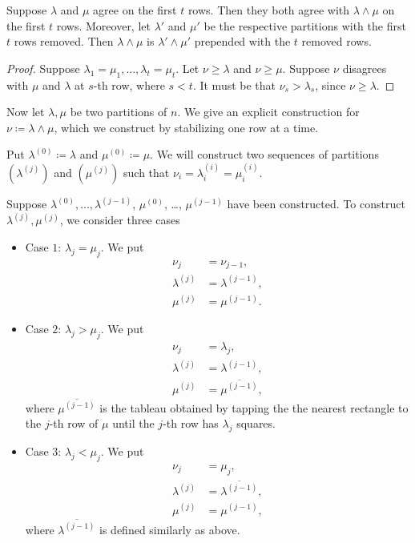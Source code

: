 \documentclass{article}
\begin{document}
\begin{lemma}
    Suppose $\lambda$ and $\mu$ agree on the first $t$ rows. Then they both agree with $\lambda \wedge \mu$ on the first $t$ rows. Moreover, let $\lambda'$ and $\mu'$ be the respective partitions with the first $t$ rows removed. Then $\lambda \wedge \mu$ is $\lambda' \wedge \mu'$ prepended with the $t$ removed rows.
\end{lemma}
\begin{proof}
    Suppose $\lambda_1 = \mu_1, \ldots, \lambda_t = \mu_t$.
    Let $\nu \geq \lambda$ and $\nu \geq \mu$.
    Suppose $\nu$ disagrees with $\mu$ and $\lambda$ at $s$-th row, where $s < t$.
    It must be that $\nu_s > \lambda_s$, since $\nu \geq \lambda$. 
\end{proof}

Now let $\lambda, \mu$ be two partitions of $n$. 
We give an explicit construction for $\nu \coloneq \lambda \wedge \mu$, which we construct by stabilizing one row at a time.

Put $\lambda^{(0)} \coloneq \lambda$ and $\mu^{(0)} \coloneq \mu$. We will construct two sequences of partitions $(\lambda^{(j)})$ and $(\mu^{(j)})$ such that $\nu_i = \lambda^{(i)}_i = \mu^{(i)}_i$.


Suppose $\lambda^{(0)}, \ldots, \lambda^{(j-1)}$, $\mu^{(0)}$, \ldots, $\mu^{(j-1)}$ have been constructed. 
To construct $\lambda^{(j)}, \mu^{(j)}$, we consider three cases
\begin{itemize}
    \item Case $1$: $\lambda_j = \mu_j$. We put 
        \begin{align*}
            \nu_j &= \nu_{j-1}, \\
            \lambda^{(j)} &= \lambda^{(j-1)}, \\
            \mu^{(j)} &= \mu^{(j-1)}.
        \end{align*}
    \item Case $2$: $\lambda_j > \mu_j$. We put 
        \begin{align*}
            \nu_j &= \lambda_j, \\
            \lambda^{(j)} &= \lambda^{(j-1)}, \\
            \mu^{(j)} &= \overline{\mu^{(j-1)}},
        \end{align*}
        where $\overline{\mu^{(j-1)}}$ is the tableau obtained by tapping the the nearest rectangle to the $j$-th row of $\mu$ until the $j$-th row has $\lambda_j$ squares.
    \item Case $3$: $\lambda_j < \mu_j$. We put 
        \begin{align*}
            \nu_j &= \mu_j, \\
            \lambda^{(j)} &= \overline{\lambda^{(j-1)}}, \\
            \mu^{(j)} &= \mu^{(j-1)},
        \end{align*}
        where $\overline{\lambda^{(j-1)}}$ is defined similarly as above.
\end{itemize}
\end{document}
